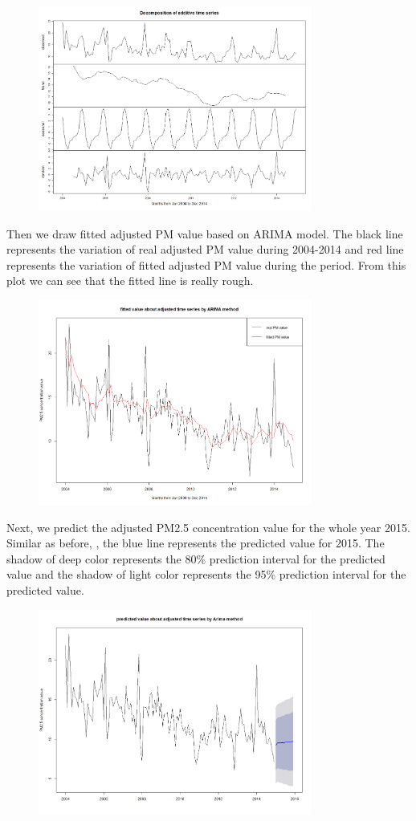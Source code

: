 \documentclass[10pt]{article}
\begin{document}
\begin{figure}[ht!]
\centering
\includegraphics[width = 90mm]{ts4.png}
\end{figure}

Then we draw fitted adjusted PM value based on ARIMA model. The black line represents the variation of real adjusted PM value during 2004-2014 and red line represents the variation of fitted adjusted PM value during the period. From this plot we can see that the fitted line is really rough.

\begin{figure}[ht!]
\centering
\includegraphics[width = 90mm]{ts5.png}
\end{figure}

Next, we predict the adjusted PM2.5 concentration value for the whole year 2015. Similar as before, , the blue line represents the predicted value for 2015. The shadow of deep color represents the 80\% prediction interval for the predicted value and the shadow of light color represents the 95\% prediction interval for the predicted value.

\begin{figure}[ht!]
\centering
\includegraphics[width = 90mm]{ts6.png}
\end{figure}
\end{document}
